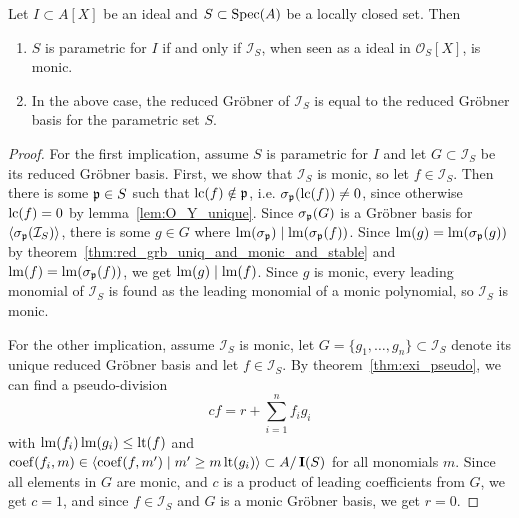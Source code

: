\begin{theorem}\label{thm:para_iff_I_S_monic}
  Let $I \subset A[X]$ be an ideal and $S \subset \operatorname{Spec}(A)$ be a locally closed set. Then
  \begin{enumerate}
    \item $S$ is parametric for $I$ if and only if $\mathcal I_{S}$, when seen as a ideal in $\mathcal O_{S}[X]$, is monic.
    \item In the above case, the reduced Gröbner of $\mathcal I_{S}$ is equal to the reduced Gröbner basis for the parametric set $S$.
  \end{enumerate}
\end{theorem}
\begin{proof}
  For the first implication, assume $S$ is parametric for $I$ and let $G \subset \mathcal I_{S}$ be its reduced Gröbner basis. First, we show that $\mathcal I_{S}$ is monic, so let $f \in \mathcal I_{S}$. Then there is some $\mathfrak p \in S$ such that $\operatorname{lc}(f) \notin \mathfrak p$, i.e. $\sigma_{\mathfrak p}(\operatorname{lc}(f)) \neq 0$, since otherwise $\operatorname{lc}(f) = 0$ by lemma~\ref{lem:O_Y_unique}. Since $\sigma_{\mathfrak p}(G)$ is a Gröbner basis for $\langle \sigma_{\mathfrak p}(\mathcal I_{S}) \rangle$, there is some $g \in G$ where $\operatorname{lm}(\sigma_{\mathfrak p}) \mid \operatorname{lm}(\sigma_{\mathfrak p}(f))$. Since $\operatorname{lm}(g) = \operatorname{lm}(\sigma_{\mathfrak p}(g))$ by theorem~\ref{thm:red_grb_uniq_and_monic_and_stable} and $\operatorname{lm}(f) = \operatorname{lm}(\sigma_{\mathfrak p}(f))$, we get $\operatorname{lm}(g) \mid \operatorname{lm}(f)$. Since $g$ is monic, every leading monomial of $\mathcal I_{S}$ is found as the leading monomial of a monic polynomial, so $\mathcal I_{S}$ is monic.

  For the other implication, assume $\mathcal I_{S}$ is monic, let $G = \{g_{1}, \dots, g_{n}\} \subset \mathcal I_{S}$ denote its unique reduced Gröbner basis and let $f \in \mathcal I_{S}$. By theorem~\ref{thm:exi_pseudo}, we can find a pseudo-division
  \[cf = r +  \sum_{i=1}^{n} f_{i} g_{i}\]
  with $\operatorname{lm}(f_{i})\operatorname{lm}(g_{i}) \leq \operatorname{lt}(f)$ and $\operatorname{coef}(f_{i}, m) \in \langle \operatorname{coef}(f, m') \mid m' \geq m \operatorname{lt}(g_{i}) \rangle \subset A/\operatorname{\mathbf I}(S)$ for all monomials $m$. Since all elements in $G$ are monic, and $c$ is a product of leading coefficients from $G$, we get $c = 1$, and since $f \in \mathcal I_{S}$ and $G$ is a monic Gröbner basis, we get $r = 0$.


\end{proof}
